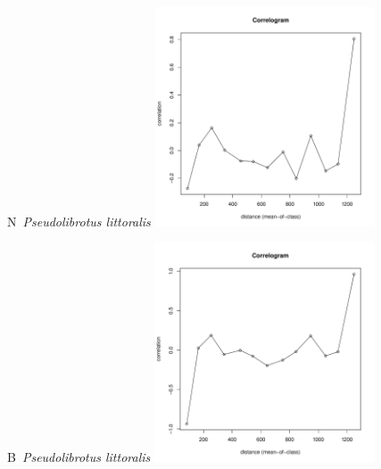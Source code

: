 \documentclass[12pt, a4paper]{disser}
\begin{document}
\begin{figure}[h]
	
	\begin{minipage}[b]{.46\linewidth}
	\begin{center}
	{\small N~{\it Pseudolibrotus littoralis}}
	\includegraphics[width=65mm]{../Barenc_Sea/distribution_Moran/Plyazh07_moran_N_Pseudolibrotus_littoralis_.pdf}

	\end{center}
	\end{minipage}
	\hfil %
	\begin{minipage}[b]{.46\linewidth}
	\begin{center}
	{\small B~{\it Pseudolibrotus littoralis}}
		\includegraphics[width=65mm]{../Barenc_Sea/distribution_Moran/Plyazh07_moran_B_Pseudolibrotus_littoralis_.pdf}
	\end{center}
	\end{minipage}






\end{figure}
\end{document}
